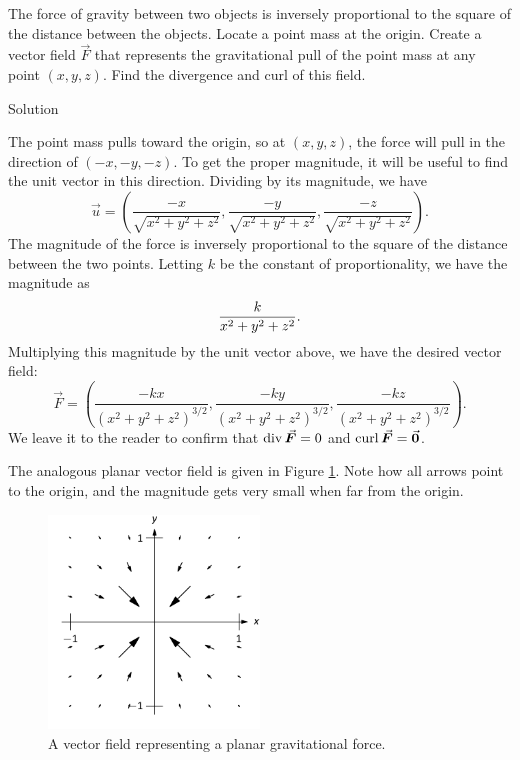 \begin{example}\label{ex_vectorfield3}
The force of gravity between two objects is inversely proportional to the square of the distance between the objects. Locate a point mass at the origin. Create a vector field $\vec F$ that represents the gravitational pull of the point mass at any point $(x,y,z)$. Find the divergence and curl of this field. 


Solution 

The point mass pulls toward the origin, so at $(x,y,z)$, the force will pull in the direction of $\left( -x, -y, -z\right)$. To get the proper magnitude, it will be useful to find the unit vector in this direction. Dividing by its magnitude, we have $$\vec u = \left( \frac{-x}{\sqrt{x^2+y^2+z^2}}, \frac{-y}{\sqrt{x^2+y^2+z^2}},\frac{-z}{\sqrt{x^2+y^2+z^2}}\right).$$
The magnitude of the force is inversely proportional to the square of the distance between the two points. Letting $k$ be the constant of proportionality, we have the magnitude as $$\displaystyle\frac{k}{x^2+y^2+z^2}.$$ Multiplying this magnitude by the unit vector above, we have the desired vector field:
$$\vec F = \left( \frac{-kx}{(x^2+y^2+z^2)^{3/2}}, \frac{-ky}{(x^2+y^2+z^2)^{3/2}},\frac{-kz}{(x^2+y^2+z^2)^{3/2}}\right).$$
We leave it to the reader to confirm that $\divv \vec F = 0$ and $\curl \vec F = \vec 0$.

The analogous planar vector field is given in Figure \ref{fig_Vector_Calc_7}. Note how all arrows point to the origin, and the magnitude gets very small when far from the origin.

\begin{figure}[H]
	\begin{center}
			\includegraphics[width=0.5\textwidth]{fig_Vector_Calc_7}
	\caption{A vector field representing a planar gravitational force.}
	\label{fig_Vector_Calc_7}
	\end{center}
\end{figure}

\end{example}




